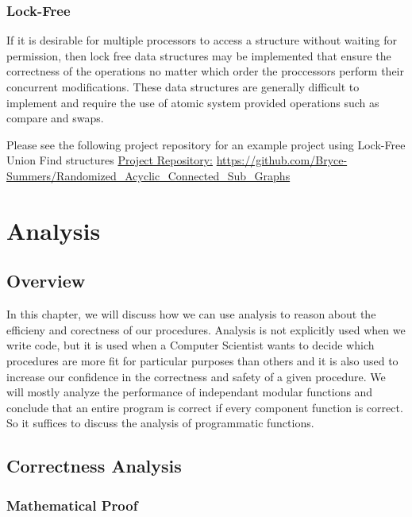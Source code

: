 \documentclass[12pt, letterpaper]{book}
\begin{document}
	\subsection{Lock-Free}
	If it is desirable for multiple processors to access a structure without waiting for permission, then lock free data structures may be implemented that ensure the correctness of the operations no matter which order the proccessors perform their concurrent modifications. These data structures are generally difficult to implement and require the use of atomic system provided operations such as compare and swaps.

	Please see the following project repository for an example project using Lock-Free Union Find structures \href{https://github.com/Bryce-Summers/Randomized_Acyclic_Connected_Sub_Graphs}{Project Repository:}
\url{https://github.com/Bryce-Summers/Randomized_Acyclic_Connected_Sub_Graphs} 

\chapter{Analysis} \label{analysis}

	\section{Overview}

		In this chapter, we will discuss how we can use analysis to reason about the efficieny and corectness of our procedures. Analysis is not explicitly used when we write code, but it is used when a Computer Scientist wants to decide which procedures are more fit for particular purposes than others and it is also used to increase our confidence in the correctness and safety of a given procedure. We will mostly analyze the performance of independant modular functions and conclude that an entire program is correct if every component function is correct. So it suffices to discuss the analysis of programmatic functions.

	\section{Correctness Analysis}

		\subsection{Mathematical Proof}
\end{document}
